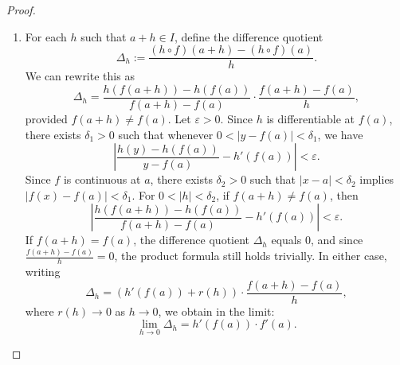 \begin{proof}
\begin{enumerate}
        \item For each $h$ such that $a+h \in I$, define the difference quotient
            $$\Delta_h := \frac{(h \circ f)(a+h) - (h \circ f)(a)}{h}.$$
            We can rewrite this as
            $$\Delta_h = \frac{h(f(a+h)) - h(f(a))}{f(a+h) - f(a)} \cdot \frac{f(a+h) - f(a)}{h},$$
            provided $f(a+h) \neq f(a)$. Let $\varepsilon > 0$. Since $h$ is differentiable at $f(a)$, there exists $\delta_1 > 0$ such that whenever $0 < |y - f(a)| < \delta_1$, we have
            $$\left| \frac{h(y) - h(f(a))}{y - f(a)} - h'(f(a)) \right| < \varepsilon.$$
            Since $f$ is continuous at $a$, there exists $\delta_2 > 0$ such that $|x - a| < \delta_2$ implies $|f(x) - f(a)| < \delta_1$. For $0 < |h| < \delta_2$, if $f(a+h) \neq f(a)$, then
            $$\left| \frac{h(f(a+h)) - h(f(a))}{f(a+h) - f(a)} - h'(f(a)) \right| < \varepsilon.$$
            If $f(a+h) = f(a)$, the difference quotient $\Delta_h$ equals $0$, and since $\frac{f(a+h)-f(a)}{h} = 0$, the product formula still holds trivially. In either case, writing
            $$\Delta_h = \left( h'(f(a)) + r(h) \right) \cdot \frac{f(a+h) - f(a)}{h},$$
            where $r(h) \to 0$ as $h \to 0$, we obtain in the limit:
            $$\lim_{h \to 0} \Delta_h = h'(f(a)) \cdot f'(a).$$
    \end{enumerate}
\end{proof}
